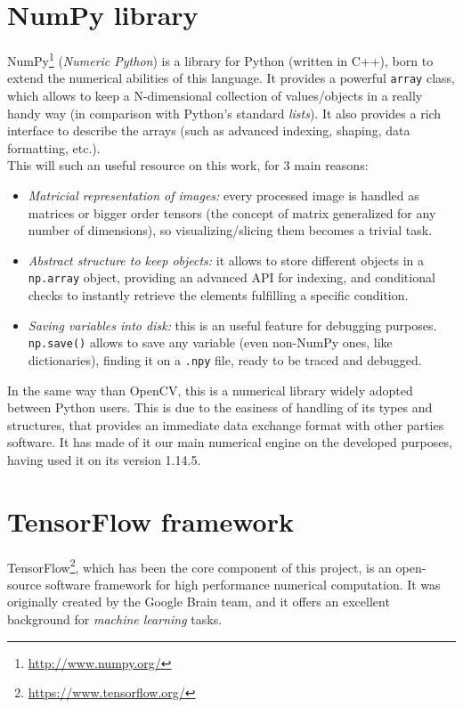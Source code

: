 \section{NumPy library}
	NumPy\footnote{\url{http://www.numpy.org/}} (\emph{Numeric Python}) is a library for Python (written in C++), born to extend the numerical abilities of this language. It provides a powerful \texttt{array} class, which allows to keep a N-dimensional collection of values/objects in a really handy way (in comparison with Python's standard \emph{lists}). It also provides a rich interface to describe the arrays (such as advanced indexing, shaping, data formatting, etc.).\\
	This will such an useful resource on this work, for 3 main reasons:
	\begin{itemize}
		\item \emph{Matricial representation of images:} every processed image is handled as matrices or bigger order tensors (the concept of matrix generalized for any number of dimensions), so visualizing/slicing them becomes a trivial task.
		\item \emph{Abstract structure to keep objects:} it allows to store different objects in a \texttt{np.array} object, providing an advanced API for indexing, and conditional checks to instantly retrieve the elements fulfilling a specific condition.
		\item \emph{Saving variables into disk:} this is an useful feature for debugging purposes. \texttt{np.save()} allows to save any variable (even non-NumPy ones, like dictionaries), finding it on a \texttt{.npy} file, ready to be traced and debugged.
	\end{itemize}

In the same way than OpenCV, this is a numerical library widely adopted between Python users. This is due to the easiness of handling of its types and structures, that provides an immediate data exchange format with other parties software. It has made of it our main numerical engine on the developed purposes, having used it on its version 1.14.5.



\section{TensorFlow framework}
	\label{sec:3_tensorflow}
	TensorFlow\footnote{\url{https://www.tensorflow.org/}}, which has been the core component of this project, is an open-source software framework for high performance numerical computation. It was originally created by the Google Brain team, and it offers an excellent background for \emph{machine learning} tasks.\\
	
